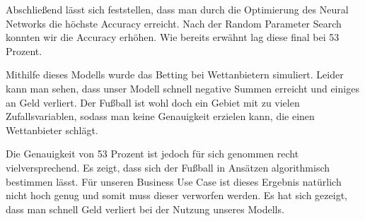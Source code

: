 Abschließend lässt sich feststellen, dass man durch die
Optimierung des Neural Networks die höchste Accuracy erreicht.
Nach der Random Parameter Search konnten wir die Accuracy erhöhen.
Wie bereits erwähnt lag diese final bei 53 Prozent.


Mithilfe dieses Modells wurde das Betting bei Wettanbietern simuliert. Leider
 kann man sehen, dass unser Modell schnell negative Summen erreicht
  und einiges an Geld verliert. Der Fußball ist wohl doch ein
  Gebiet mit zu vielen Zufallsvariablen, sodass man keine
  Genauigkeit erzielen kann, die einen Wettanbieter schlägt.


  Die Genauigkeit von 53 Prozent ist jedoch für sich genommen
  recht vielversprechend. Es zeigt, dass sich der Fußball in
  Ansätzen algorithmisch bestimmen lässt. Für unseren Business
  Use Case ist dieses Ergebnis natürlich nicht hoch genug und
  somit muss dieser verworfen werden. Es hat sich gezeigt, dass
  man schnell Geld verliert bei der Nutzung unseres Modells.